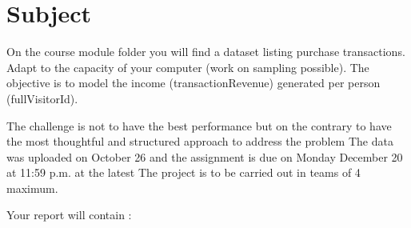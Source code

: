 \documentclass[a4paper, 12pt, one column]{article}
\begin{document}
\renewcommand{\headrulewidth}{1pt}
\fancyfoot[C]{\thepage}


\section*{Subject}

On the course module folder you will find a dataset listing purchase transactions. Adapt to the capacity of your computer (work on sampling possible).
The objective is to model the income (transactionRevenue) generated per person (fullVisitorId).

The challenge is not to have the best performance but on the contrary to have the most thoughtful and structured approach to address the problem
The data was uploaded on October 26 and the assignment is due on Monday December 20 at 11:59 p.m. at the latest
The project is to be carried out in teams of 4 maximum.

Your report will contain :\\
\end{document}
